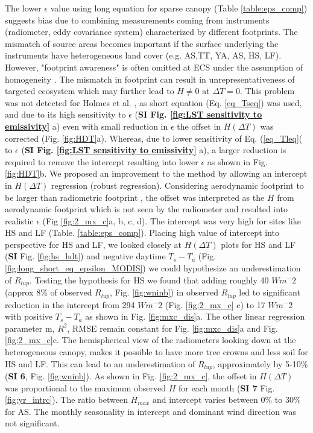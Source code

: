 \documentclass[fleqn,10pt]{wlscirep}
\begin{document}
The lower $\epsilon$ value using long equation for sparse canopy (Table \ref{table:eps_comp}) suggests bias due to combining measurements coming from instruments (radiometer, eddy covariance system) characterized by different footprints\cite{marcolla2018geometry}. The mismatch of  source areas becomes important if the surface underlying the instruments  have heterogeneous land cover (e.g. AS,TT, YA, AS, HS, LF). However, "footprint awareness" is  often omitted at ECS under the assumption of ho­mogeneity \cite{chu2021representativeness}. The mismatch in footprint can result in unrepresentativeness of targeted ecosystem which may further lead to $H\not= 0$ at $\Delta T=0$. This problem was not detected for Holmes et al. \cite{holmes_land_2009-1}, as short equation (Eq. \ref{eq_Tseq}) was used, and due to its high sensitivity to $\epsilon$ (\textbf{SI Fig. \ref{fig:LST sensitivity to emissivity}} a) even  with small reduction in $\epsilon$ the offset in $H(\Delta T)$ was corrected (Fig. \ref{fig:HDT}a). Whereas, due to lower sensitivity of Eq. (\ref{eq_Tleq}( to $\epsilon$ (\textbf{SI Fig. \ref{fig:LST sensitivity to emissivity}} a), a larger reduction is required to remove the intercept resulting into lower $\epsilon$ as shown in Fig. \ref{fig:HDT}b. We proposed an improvement to the method by allowing an intercept in $H(\Delta T)$ regression (robust regression). Considering aerodynamic footprint to be larger than radiometric footprint \cite{marcolla2018geometry,chu2021representativeness}, the offset was interpreted as the $H$ from aerodynamic footprint which is not seen by the radiometer and resulted into realistic $\epsilon$ (Fig {\ref{fig:2_mx_c}a, b, c, d). The intercept was very high for sites like HS and LF (Table. \ref{table:eps_comp}). Placing high value of intercept into perspective for HS and LF, we looked closely at $H(\Delta T)$ plots for HS and LF (\textbf{SI} Fig. \ref{fig:hs_hdt}) and negative daytime $T_{s} -T_{a}$ (Fig. \ref{fig:long_short_eq_epsilon_MODIS}) we could hypothesize an underestimation of $R_{lup}$. Testing the hypothesis for HS we found that  adding roughly 40 $Wm^-{2}$ (approx 8\% of observed $R_{lup}$, Fig. \ref{fig:wninb}) in observed $R_{lup}$ led to significant reduction in the intercept from 294 $Wm^-{2}$ (Fig. \ref{fig:2_mx_c} c) to 17 $Wm^-{2}$ with positive $T_{s} - T_{a}$ as shown in Fig. \ref{fig:mxc_dis}a. The other linear regression parameter m, $R^{2}$, RMSE remain constant for Fig. \ref{fig:mxc_dis}a and Fig. \ref{fig:2_mx_c}c. The hemispherical view of the radiometers looking down at the heterogeneous canopy, makes it possible to have more tree crowns and less soil for HS and LF. This can lead to an underestimation of $R_{lup}$, approximately by 5-10$\%$ (\textbf{SI 6}, Fig. \ref{fig:wninb}). As shown in Fig. \ref{fig:2_mx_c}, the offset in $H(\Delta T)$ was proportional to the maximum observed $H$ for each month (\textbf{SI 7} Fig. \ref{fig:yr_intrc}). The ratio between $H_{max}$ and intercept varies between $0\%$ to $30 \%$ for AS. The monthly seasonality in intercept and dominant wind direction was not significant.
}
\end{document}
